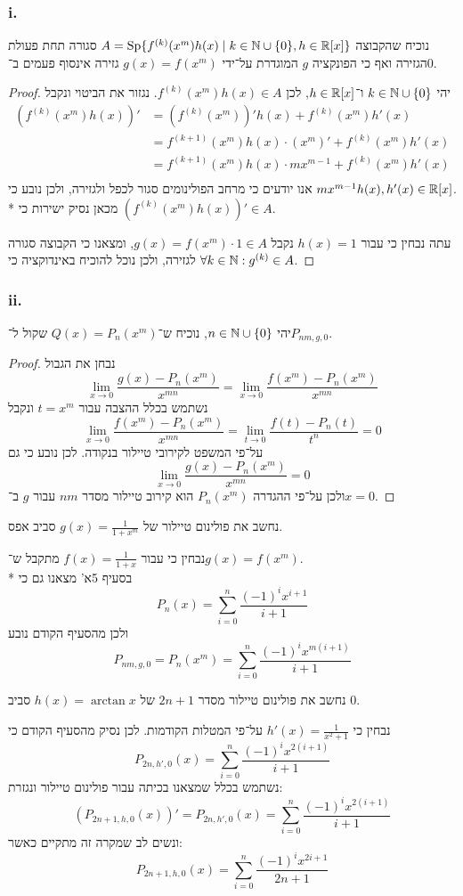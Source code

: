 \subsubsection{i.}
נוכיח שהקבוצה $A = \operatorname{Sp}\{ f^{(k)}(x^m)h(x) \mid k \in \mathbb{N} \cup \{0\}, h \in \mathbb{R}[x]\}$ סגורה תחת פעולת הגזירה ואף כי הפונקציה $g$ המוגדרת על־ידי $g(x) = f(x^m)$ גזירה אינסוף פעמים ב־$0$.
\begin{proof}
	יהי $k \in \mathbb{N} \cup \{0\}$ ו־$h \in \mathbb{R}[x]$, לכן $f^{(k)}(x^m)h(x) \in A$.
	נגזור את הביטוי ונקבל
	\begin{align*}
		(f^{(k)}(x^m)h(x))'
		& = (f^{(k)}(x^m))'h(x) + f^{(k)}(x^m)h'(x) \\
		& = f^{(k + 1)}(x^m)h(x) \cdot (x^m)' + f^{(k)}(x^m)h'(x) \\
		& = f^{(k + 1)}(x^m)h(x) \cdot mx^{m - 1} + f^{(k)}(x^m)h'(x) \\
	\end{align*}
	אנו יודעים כי מרחב הפולינומים סגור לכפל ולגזירה, ולכן נובע כי $mx^{m - 1}h(x), h'(x) \in \mathbb{R}[x]$. \\*
	מכאן נסיק ישירות כי $(f^{(k)}(x^m)h(x))' \in A$.

	עתה נבחין כי עבור $h(x) = 1$ נקבל $g(x) = f(x^m) \cdot 1 \in A$, ומצאנו כי הקבוצה סגורה לגזירה, ולכן נוכל להוכיח באינדוקציה כי $\forall k \in \mathbb{N}: g^{(k)} \in A$.
\end{proof}

\subsubsection{ii.}
יהי $n \in \mathbb{N} \cup \{0\}$, נוכיח ש־$Q(x) = P_n(x^m)$ שקול ל־$P_{nm, g, 0}$.
\begin{proof}
	נבחן את הגבול
	\[
		\lim_{x \to 0} \frac{g(x) - P_n(x^m)}{x^{mn}}
		= \lim_{x \to 0} \frac{f(x^m) - P_n(x^m)}{x^{mn}}
	\]
	נשתמש בכלל ההצבה עבור $t = x^m$ ונקבל
	\[
		\lim_{x \to 0} \frac{f(x^m) - P_n(x^m)}{x^{mn}}
		= \lim_{t \to 0} \frac{f(t) - P_n(t)}{t^n}
		= 0
	\]
	על־פי המשפט לקירובי טיילור בנקודה. לכן נובע כי גם
	\[
		\lim_{x \to 0} \frac{g(x) - P_n(x^m)}{x^{mn}}
		= 0
	\]
	ולכן על־פי ההגדרה $P_n(x^m)$ הוא קירוב טיילור מסדר $nm$ עבור $g$ ב־$x = 0$.
\end{proof}

\Subquestion{}
נחשב את פולינום טיילור של $g(x) = \frac{1}{1 + x^m}$ סביב אפס.

נבחין כי עבור $f(x) = \frac{1}{1 + x}$ מתקבל ש־$g(x) = f(x^m)$. \\*
בסעיף 5א' מצאנו גם כי
\[
	P_n(x) = \sum_{i = 0}^{n} \frac{{(-1)}^i x^{i + 1}}{i + 1}
\]
ולכן מהסעיף הקודם נובע
\[
	P_{nm, g, 0} = P_n(x^m)
	= \sum_{i = 0}^{n} \frac{{(-1)}^i x^{m(i + 1)}}{i + 1}
\]

\Subquestion{}
נחשב את פולינום טיילור מסדר $2n + 1$ של $h(x) = \arctan x$ סביב $0$.

נבחין כי $h'(x) = \frac{1}{x^2 + 1}$ על־פי המטלות הקודמות. לכן נסיק מהסעיף הקודם כי
\[
	P_{2n, h', 0}(x)
	= \sum_{i = 0}^{n} \frac{{(-1)}^i x^{2(i + 1)}}{i + 1}
\]
נשתמש בכלל שמצאנו בכיתה עבור פולינום טיילור ונגזרת:
\[
	(P_{2n + 1, h, 0}(x))'
	= P_{2n, h', 0}(x)
	= \sum_{i = 0}^{n} \frac{{(-1)}^i x^{2(i + 1)}}{i + 1}
\]
ונשים לב שמקרה זה מתקיים כאשר:
\[
	P_{2n + 1, h, 0}(x)
	= \sum_{i = 0}^{n} \frac{{(-1)}^i x^{2i + 1}}{2n + 1}
\]


